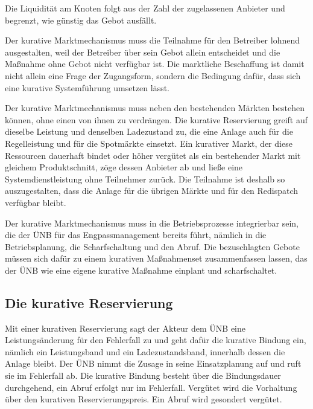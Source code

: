 \begin{description}
    Die Liquidität am Knoten folgt aus der Zahl der zugelassenen Anbieter und begrenzt, wie günstig das Gebot ausfällt.
    \item[A6 -- Teilnahme] Der kurative Marktmechanismus muss die Teilnahme für den Betreiber lohnend ausgestalten, weil der Betreiber über sein Gebot allein entscheidet und die Maßnahme ohne Gebot nicht verfügbar ist.
    Die marktliche Beschaffung ist damit nicht allein eine Frage der Zugangsform, sondern die Bedingung dafür, dass sich eine kurative Systemführung umsetzen lässt.
    \item[A7 -- Verträglichkeit] Der kurative Marktmechanismus muss neben den bestehenden Märkten bestehen können, ohne einen von ihnen zu verdrängen.
    Die kurative Reservierung greift auf dieselbe Leistung und denselben Ladezustand zu, die eine Anlage auch für die Regelleistung und für die Spotmärkte einsetzt.
    Ein kurativer Markt, der diese Ressourcen dauerhaft bindet oder höher vergütet als ein bestehender Markt mit gleichem Produktschnitt, zöge dessen Anbieter ab und ließe eine Systemdienstleistung ohne Teilnehmer zurück.
    Die Teilnahme ist deshalb so auszugestalten, dass die Anlage für die übrigen Märkte und für den Redispatch verfügbar bleibt.
    \item[A8 -- Umsetzbarkeit] Der kurative Marktmechanismus muss in die Betriebsprozesse integrierbar sein, die der \ac{ÜNB} für das Engpassmanagement bereits führt, nämlich in die Betriebsplanung, die Scharfschaltung und den Abruf.
    Die bezuschlagten Gebote müssen sich dafür zu einem kurativen Maßnahmenset zusammenfassen lassen, das der \ac{ÜNB} wie eine eigene kurative Maßnahme einplant und scharfschaltet.
\end{description}

\subsection{Die kurative Reservierung}
\label{sec:product_scope}
\label{sec:product_parameters}

Mit einer kurativen Reservierung sagt der Akteur dem \ac{ÜNB} eine Leistungsänderung für den Fehlerfall zu und geht dafür die kurative Bindung ein, nämlich ein Leistungsband und ein Ladezustandsband, innerhalb dessen die Anlage bleibt.
Der \ac{ÜNB} nimmt die Zusage in seine Einsatzplanung auf und ruft sie im Fehlerfall ab.
Die kurative Bindung besteht über die Bindungsdauer durchgehend, ein Abruf erfolgt nur im Fehlerfall.
Vergütet wird die Vorhaltung über den kurativen Reservierungspreis.
Ein Abruf wird gesondert vergütet.

